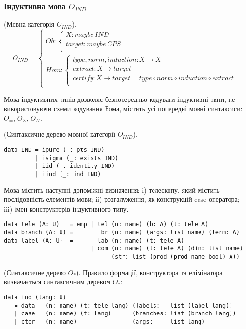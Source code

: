 \begin{definition}
\newpage
\subsubsection{Індуктивна мова $O_{IND}$}

\begin{definition} (Мовна категорія $O_{IND}$).
$$
O_{IND} =
\begin{cases}
Ob: \begin{cases}
X: maybe\ IND \\
target: maybe\ CPS \\
\end{cases} \\
Hom: \begin{cases}
type,norm,induction: X \rightarrow X \\
extract: X \rightarrow target \\
certify: X \rightarrow target = type \circ norm \circ induction \circ extract \\
\end{cases}
\end{cases}
$$

Мова індуктивних типів дозволяє безпосередньо кодувати індуктивні типи,
не використовуючи схеми кодування Бома, містить усі попередні мовні синтаксиси:
$O_=$, $O_\Sigma$, $O_\Pi$.

\begin{definition} (Синтаксичне дерево мовної категорії $O_{IND}$).
\begin{lstlisting}
data IND = ipure (_: pts IND)
         | isigma (_: exists IND)
         | iid (_: identity IND)
         | iind (_: ind IND)
\end{lstlisting}

Мова містить наступні допоміжні визначення: i) телескопу,
який містить послідовність елементів мови; ii) розгалуження,
як конструкцій case оператора; iii) імен конструкторів індуктивного типу.

\begin{lstlisting}
data tele (A: U)   = emp | tel (n: name) (b: A) (t: tele A)
data branch (A: U) =        br (n: name) (args: list name) (term: A)
data label (A: U)  =       lab (n: name) (t: tele A)
                         | com (n: name) (t: tele A) (dim: list name)
                               (str: list (prod (prod name bool) A))
\end{lstlisting}

\begin{definition} (Синтаксичне дерево $O_*$).
Правило формації, конструктора та елімінатора визначається синтаксичним деревом $O_*$:
\begin{lstlisting}
data ind (lang: U)
   = data_  (n: name) (t: tele lang) (labels:   list (label lang))
   | case   (n: name) (t: lang)      (branches: list (branch lang))
   | ctor   (n: name)                (args:     list lang)
\end{lstlisting}


\end{definition}
\end{definition}
\end{definition}
\end{definition}
